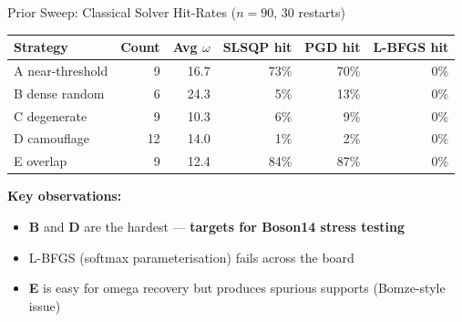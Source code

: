 \documentclass[aspectratio=169]{beamer}
\begin{document}
\begin{frame}{Prior Sweep: Classical Solver Hit-Rates ($n{=}90$, 30 restarts)}
    \begin{table}
    \footnotesize
    \begin{tabular}{l r r r r r}
        \toprule
        \textbf{Strategy} & \textbf{Count} & \textbf{Avg $\omega$} & \textbf{SLSQP hit} & \textbf{PGD hit} & \textbf{L-BFGS hit} \\
        \midrule
        A near-threshold  & 9  & 16.7 & 73\% & 70\% & 0\% \\
        \alert{B dense random}    & 6  & 24.3 & \alert{5\%}  & \alert{13\%} & 0\% \\
        C degenerate      & 9  & 10.3 & 6\%  & 9\%  & 0\% \\
        \alert{D camouflage}      & 12 & 14.0 & \alert{1\%}  & \alert{2\%}  & 0\% \\
        E overlap         & 9  & 12.4 & 84\% & 87\% & 0\% \\
        \bottomrule
    \end{tabular}
    \end{table}

    \vspace{0.5em}
    \textbf{Key observations:}
    \begin{itemize}
        \item \textbf{B} and \textbf{D} are the hardest --- \textbf{targets for Boson14 stress testing}
        \item L-BFGS (softmax parameterisation) fails across the board
        \item \textbf{E} is easy for omega recovery but produces spurious supports (Bomze-style issue)
    \end{itemize}
\end{frame}

\end{document}
